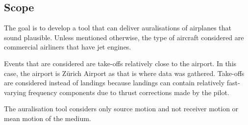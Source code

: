 \subsection{Scope}
The goal is to develop a tool that can deliver auralisations of airplanes that
sound plausible. Unless mentioned otherwise, the type of aircraft considered are
commercial airliners that have jet engines.

Events that are considered are take-offs relatively close to the airport. In
this case, the airport is Z\"{u}rich Airport as that is where data was gathered.
Take-offs are considered instead of landings because landings can contain
relatively fast-varying frequency components due to thrust corrections made by the pilot.

The auralisation tool considers only source motion and not receiver motion
or mean motion of the medium.




